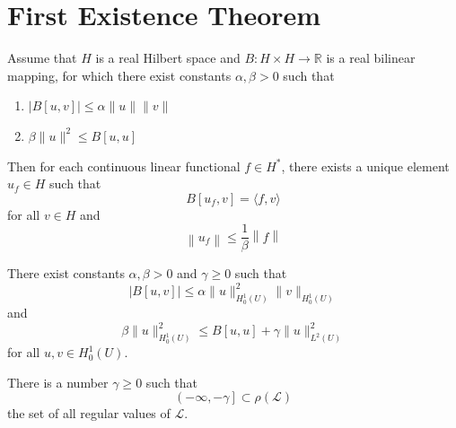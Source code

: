 \section{First Existence Theorem}
\begin{theorem}
    Assume that $H$ is a real Hilbert space and
    $B: H \times H \rightarrow \mathbb{R}$
    is a real bilinear mapping, for which there exist constants $\alpha, \beta>0$ such that
    \begin{enumerate}[label=(\roman*)]
        \item $\left|B[u, v]\right| \leq \alpha\|u\|\|v\| $
        \item $\beta\|u\|^2 \leq B[u, u] $
    \end{enumerate}
    Then for each continuous linear functional $f \in H^*$, there exists a unique element $u_f \in H$ such that
    \begin{equation*}
        B[u_f, v]=\langle f, v\rangle
    \end{equation*}
    for all $v \in H$ and
    \begin{equation*}
        \left\|u_f \right\|\leq \frac{1}{\beta}\left\|f\right\|
    \end{equation*}
\end{theorem}
\begin{theorem}
    There exist constants $\alpha, \beta>0$ and $\gamma \geq 0$ such that
    \begin{equation*}
        \left|B[u, v]\right|\leq \alpha\|u\|_{H_0^1(U)}^2\|v\|_{H_0^1(U)}
    \end{equation*}
    and
    \begin{equation*}
        \beta\|u\|_{H_0^1(U)}^2 \leq B[u, u]+\gamma\|u\|_{L^2(U)}^2
    \end{equation*}
    for all $u, v \in H_0^1 \left(U\right)$.
\end{theorem}

\begin{theorem}
    \label{thm: First existence theorem for weak solutions}
    There is a number $\gamma \geq 0$ such that
    \begin{equation*}
        \left(-\infty,-\gamma\right] \subset \rho(\mathcal{L})
    \end{equation*}
    the set of all regular values of $\mathcal{L}$.
\end{theorem}


